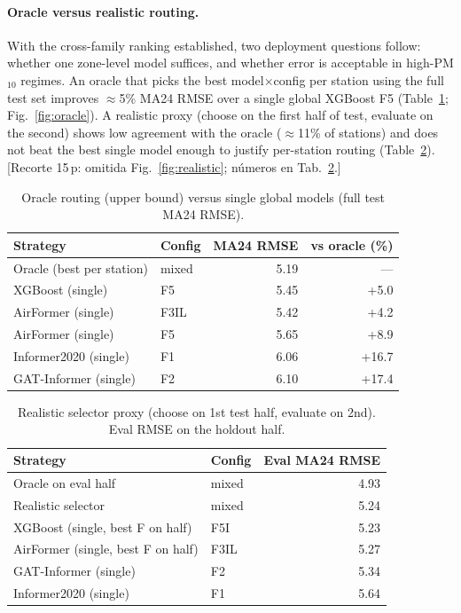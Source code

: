 \documentclass[11pt]{article}
\newcommand{\revnew}[1]{\textcolor{orange!75!black}{#1}}
\begin{document}
\paragraph{Oracle versus realistic routing.}
With the cross-family ranking established, two deployment questions follow: whether one zone-level model suffices, and whether error is acceptable in high-PM$_{10}$ regimes. An oracle that picks the best model$\times$config per station using the full test set improves $\approx$5\% MA24 RMSE over a single global XGBoost F5 (Table~\ref{tab:oracle}; Fig.~\ref{fig:oracle}). A realistic proxy (choose on the first half of test, evaluate on the second) shows low agreement with the oracle ($\approx$11\% of stations) and does not beat the best single model enough to justify per-station routing (Table~\ref{tab:realistic}).
\revnew{[Recorte 15\,p: omitida Fig.~\ref{fig:realistic}; números en Tab.~\ref{tab:realistic}.]}

\begin{table}[H]
\centering
\caption{Oracle routing (upper bound) versus single global models
(full test MA24 RMSE).}
\label{tab:oracle}
\small
\begin{tabular}{@{}llrr@{}}
\toprule
Strategy & Config & MA24 RMSE & vs oracle (\%) \\
\midrule
Oracle (best per station) & mixed & 5.19 & --- \\
XGBoost (single) & F5 & 5.45 & +5.0 \\
AirFormer (single) & F3IL & 5.42 & +4.2 \\
AirFormer (single) & F5 & 5.65 & +8.9 \\
Informer2020 (single) & F1 & 6.06 & +16.7 \\
GAT-Informer (single) & F2 & 6.10 & +17.4 \\
\bottomrule
\end{tabular}
\end{table}

\begin{table}[ht]
\centering
\caption{Realistic selector proxy (choose on 1st test half, evaluate on
2nd). Eval RMSE on the holdout half.}
\label{tab:realistic}
\small
\begin{tabular}{@{}llr@{}}
\toprule
Strategy & Config & Eval MA24 RMSE \\
\midrule
Oracle on eval half & mixed & 4.93 \\
Realistic selector & mixed & 5.24 \\
XGBoost (single, best F on half) & F5I & 5.23 \\
AirFormer (single, best F on half) & F3IL & 5.27 \\
GAT-Informer (single) & F2 & 5.34 \\
Informer2020 (single) & F1 & 5.64 \\
\bottomrule
\end{tabular}
\end{table}
\end{document}
